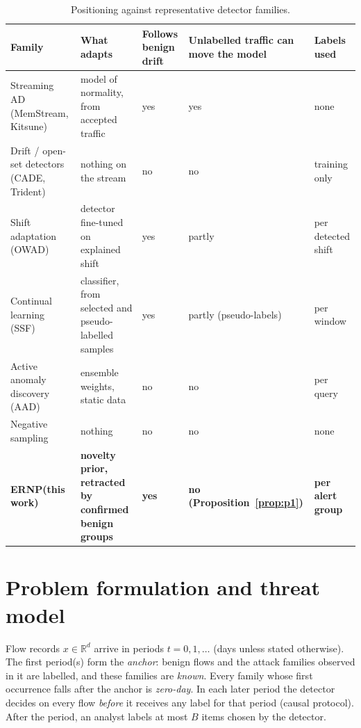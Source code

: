 \documentclass[a4paper,fleqn]{cas-dc}
\newcommand{\ERNP}{ERNP\xspace}
\newcommand{\R}{\mathbb{R}}
\begin{document}
\begin{table}[t]
\centering
\caption{Positioning against representative detector families.}
\label{tab:positioning}
\scriptsize
\setlength{\tabcolsep}{3pt}
\begin{tabularx}{\textwidth}{L{1.05}L{1.35}L{0.75}L{1.00}L{0.85}}
\toprule
Family & What adapts & Follows benign drift & Unlabelled traffic can move the model & Labels used \\
\midrule
Streaming AD (MemStream, Kitsune) & model of normality, from accepted traffic & yes & yes & none \\
Drift / open-set detectors (CADE, Trident) & nothing on the stream & no & no & training only \\
Shift adaptation (OWAD) & detector fine-tuned on explained shift & yes & partly & per detected shift \\
Continual learning (SSF) & classifier, from selected and pseudo-labelled samples & yes & partly (pseudo-labels) & per window \\
Active anomaly discovery (AAD) & ensemble weights, static data & no & no & per query \\
Negative sampling \cite{sipple2020negative} & nothing & no & no & none \\
\textbf{\ERNP (this work)} & \textbf{novelty prior, retracted by confirmed benign groups} & \textbf{yes} & \textbf{no (Proposition~\ref{prop:p1})} & \textbf{per alert group} \\
\bottomrule
\end{tabularx}
\end{table}

\section{Problem formulation and threat model}
\label{sec:problem}
Flow records $x\in\R^d$ arrive in periods $t=0,1,\dots$ (days unless stated otherwise). The first period(s) form the \emph{anchor}: benign flows and the attack families observed in it are labelled, and these families are \emph{known}. Every family whose first occurrence falls after the anchor is \emph{zero-day}. In each later period the detector decides on every flow \emph{before} it receives any label for that period (causal protocol). After the period, an analyst labels at most $B$ items chosen by the detector.
\end{document}
